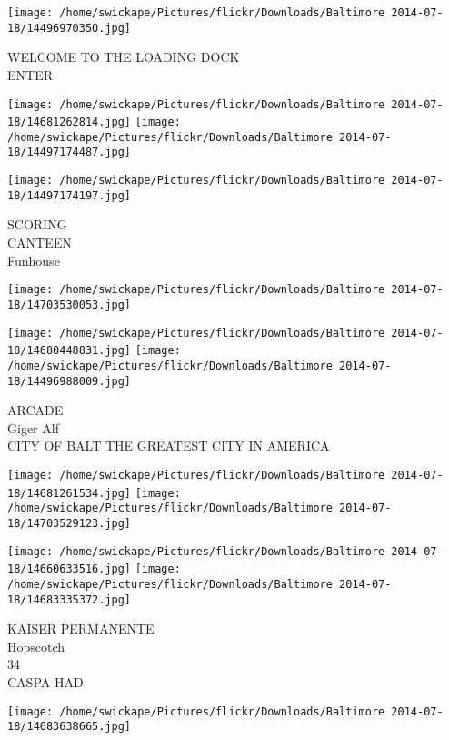 \documentclass[10pt,letterpaper]{article}
\begin{document}
\vspace{0.25in}
\texttt{[image: /home/swickape/Pictures/flickr/Downloads/Baltimore 2014-07-18/14496970350.jpg]}

WELCOME TO THE LOADING DOCK\\
ENTER\\
\pagebreak

\texttt{[image: /home/swickape/Pictures/flickr/Downloads/Baltimore 2014-07-18/14681262814.jpg]}
\texttt{[image: /home/swickape/Pictures/flickr/Downloads/Baltimore 2014-07-18/14497174487.jpg]}

\texttt{[image: /home/swickape/Pictures/flickr/Downloads/Baltimore 2014-07-18/14497174197.jpg]}

SCORING\\
CANTEEN\\
Funhouse\\
\pagebreak

\texttt{[image: /home/swickape/Pictures/flickr/Downloads/Baltimore 2014-07-18/14703530053.jpg]}

\vspace{0.25in}
\texttt{[image: /home/swickape/Pictures/flickr/Downloads/Baltimore 2014-07-18/14680448831.jpg]}
\texttt{[image: /home/swickape/Pictures/flickr/Downloads/Baltimore 2014-07-18/14496988009.jpg]}

ARCADE\\
Giger Alf\\
CITY OF BALT THE GREATEST CITY IN AMERICA\\
\pagebreak

\texttt{[image: /home/swickape/Pictures/flickr/Downloads/Baltimore 2014-07-18/14681261534.jpg]}
\texttt{[image: /home/swickape/Pictures/flickr/Downloads/Baltimore 2014-07-18/14703529123.jpg]}

\texttt{[image: /home/swickape/Pictures/flickr/Downloads/Baltimore 2014-07-18/14660633516.jpg]}
\texttt{[image: /home/swickape/Pictures/flickr/Downloads/Baltimore 2014-07-18/14683335372.jpg]}

KAISER PERMANENTE\\
Hopscotch\\
34\\
CASPA HAD\\
\pagebreak

\texttt{[image: /home/swickape/Pictures/flickr/Downloads/Baltimore 2014-07-18/14683638665.jpg]}
\end{document}
